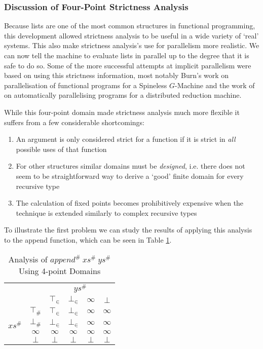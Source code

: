 \subsubsection{Discussion of Four-Point Strictness Analysis}

Because lists are one of the most common structures in functional programming,
this development allowed strictness analysis to be useful in a wide variety of
`real' systems. This also make strictness analysis's use for parallelism more
realistic. We can now tell the machine to evaluate lists in parallel up to the
degree that it is safe to do so. Some of the more successful attempts at
implicit parallelism were based on using this strictness information, most
notably Burn's work on parallelisation of functional programs for a Spineless
$G$-Machine \citep{burn1987evaluation} and the work of
\citet{hogen1992automatic} on automatically parallelising programs for a
distributed reduction machine.

While this four-point domain made strictness analysis much more flexible it
suffers from a few considerable shortcomings:

\begin{enumerate}
    \item An argument is only considered strict for a function if it is strict
        in \emph{all} possible uses of that function
    \item For other structures similar domains must be \emph{designed}, i.e.
        there does not seem to be straightforward way to derive a `good' finite
        domain for every recursive type
    \item The calculation of fixed points becomes prohibitively expensive when
        the technique is extended similarly to complex recursive types
\end{enumerate}

To illustrate the first problem we can study the results of applying this
analysis to the \<append\> function, which can be seen in Table
\ref{tab:append}.

\begin{table}[h!]
\centering
\caption{Analysis of \(append^{\#}\ xs^{\#}\ ys^{\#}\) Using 4-point Domains}
\vspace{10pt}
\begin{tabular}{c c || c c c c}
                               & \multicolumn{1}{c}{} & \multicolumn{4}{c}{$ys^{\#}$}            \\
                               &             & $\top_{\in}$ & $\bot_{\in}$ & $\infty$ & $\bot$   \\
    \cline{2-6}
    \multirow{4}{*}{$xs^{\#}$} & $\top_{\#}$ & $\top_{\in}$ & $\bot_{\in}$ & $\infty$ & $\infty$ \\
                               & $\bot_{\#}$ & $\bot_{\in}$ & $\bot_{\in}$ & $\infty$ & $\infty$ \\
                               & $\infty$    & $\infty$     & $\infty$     & $\infty$ & $\infty$ \\
                               & $\bot$      & $\bot$       & $\bot$       & $\bot$   & $\bot$
\end{tabular}    
\label{tab:append}
\end{table}


